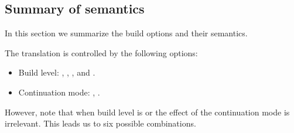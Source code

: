 \subsection{Summary of semantics}

In this section we summarize the build options and their semantics.

The translation is controlled by the following options:

\begin{itemize}
  \item Build level: , , , and .
  \item Continuation mode: , .
\end{itemize}

However, note that when build level is  or  the effect of the
continuation mode is irrelevant. This leads us to six possible combinations.

